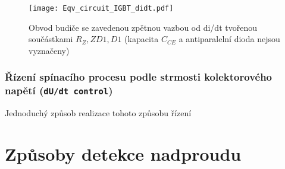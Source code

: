         \begin{figure}[ht!]
          \centering
          \texttt{[image: Eqv\_circuit\_IGBT\_didt.pdf]}
          \caption{Obvod budiče se zavedenou zpětnou vazbou od di/dt tvořenou součástkami $R_Z, ZD1, D1$ (kapacita $C_{CE}$ a antiparalelní dioda nejsou vyznačeny)}\label{VE:fig_didt}
        \end{figure}

      \subsubsection{Řízení spínacího procesu podle strmosti kolektorového napětí (\texttt{dU/dt control}) }
        Jednoduchý způsob realizace tohoto způsobu řízení

   \section{Způsoby detekce nadproudu}%


